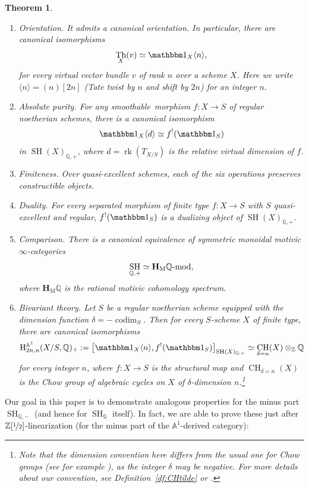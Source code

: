 \documentclass[JEP,XML,SOM,Unicode]{cedram}
\newcommand{\modl}[1]{#1\textnormal{-}\mathrm{mod}}
\DeclareMathOperator{\rk}{rk}
\renewcommand{\AA}{\mathbb A}
\newcommand{\un}{\mathbbm 1}
\newcommand{\HM}{\mathbf H_{\mathrm{M}}}
\newcommand{\BA}{\mathrm H^{\AA^1}}
\DeclareMathOperator{\codim}{codim}
\DeclareMathOperator{\SH}{SH}
\DeclareMathOperator{\CH}{CH}
\newcommand{\twist}[1]{\langle #1 \rangle}
\DeclareMathOperator{\Th}{Th}
\newcommand{\ZZ} {\mathbb Z}
\newcommand{\ZZot} {\mathbb Z[\nicefrac 1 2]}
\newcommand{\QQ} {\mathbb Q}
\newtheorem{thmi}{Theorem}
\theoremstyle{remark}
\theoremstyle{definition}
\numberwithin{equation}{thm}
\begin{document}
\begin{thmi}
\begin{enumerate}\renewcommand{\theenumi}{\Roman{enumi}}
\item\emph{Orientation.}\label{item:intro_SHQ+/orientation}
It admits a canonical orientation.
In particular, there are canonical isomorphisms
\[
\Th_X(v) \simeq \un_X\twist{n},
\]
for every virtual vector bundle $v$ of rank $n$ over a scheme $X$.
Here we write $\twist{n} = (n)[2n]$ (Tate twist by $n$ and shift by $2n$) for an integer $n$.
\item\emph{Absolute purity.}
For any smoothable\footnotemark~morphism $f : X \to S$ of regular noetherian schemes, there is a canonical isomorphism
\[ \un_{X}\twist{d} \simeq f^!(\un_{S}) \]
in $\SH(X)_{\QQ,+}$, where $d = \rk(T_{X/S})$ is the relative virtual dimension of $f$.
\item\emph{Finiteness.}
Over quasi-excellent schemes, each of the six operations preserves constructible objects.
\item\emph{Duality.}
For every separated morphism of finite type $f : X \to S$ with $S$ quasi-excellent and regular, $f^!(\un_{S})$ is a dualizing object of $\SH(X)_{\QQ,+}$.
\item\emph{Comparison.}\label{item:intro_SHQ+/comparison}
There is a canonical equivalence of symmetric monoidal motivic $\infty$-categories
\[
\SH_{\QQ,+} \simeq \modl{\HM\QQ},
\]
where $\HM\QQ$ is the rational motivic cohomology spectrum.
\item\emph{Bivariant theory.}
Let $S$ be a regular noetherian scheme equipped with the dimension function $\delta=-\codim_S$.
Then for every $S$-scheme $X$ of finite type, there are canonical isomorphisms\vspace*{-3pt}
\[
\BA_{2n,n}(X/S, \QQ)_+
:= \big[ \un_X\twist{n}, f^!(\un_S) \big]_{\SH(X)_{\QQ,+}}
\simeq \CH_{\delta=n}(X) \otimes_\ZZ \QQ
\]
for every integer $n$, where $f : X \to S$ is the structural map and $\CH_{\delta=n}(X)$ is the Chow group of algebraic cycles on $X$ of $\delta$-dimension $n$.\footnote{Note that the dimension convention here differs from the usual one for Chow groups (see for example \cite{Ful}), as the integer $\delta$ may be negative. For more details about our convention, see Definition~\ref{df:CHtilde} or \cite[Ex.\,3.1.6]{BD1}.}
\end{enumerate}
\end{thmi}

Our goal in this paper is to demonstrate analogous properties for the minus part $\SH_{\QQ,-}$ (and hence for $\SH_\QQ$ itself).
In fact, we are able to prove these just after $\ZZot$-linearization (\ie for the minus part of the $\AA^1$-derived category):
\end{document}
